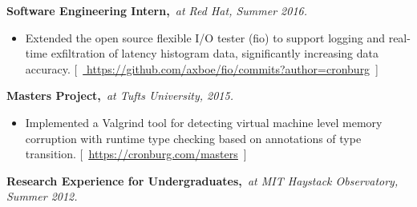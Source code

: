 \begin{minipage}{\linewidth}
{\bf Software Engineering Intern,}{\it~at Red Hat, Summer 2016.}\\[-.4cm]
\begin{itemize}[leftmargin=.5cm]
\item Extended the open source flexible I/O tester (fio) to support logging and
real-time exfiltration of latency histogram data, significantly increasing data
accuracy.
[~\underline{\href{https://github.com/axboe/fio/commits?author=cronburg}{%
https://github.com/axboe/fio/commits?author=cronburg}}~]
\iftoggle{resume}{}{%
\item Developed python scripts for processing latency data from a distributed
file system, CEPH, based on the weighted-percentiles method.
[~\underline{\href{https://www.cronburg.com/fio/MCV\_latencies.pdf}{%
https://www.cronburg.com/fio/MCV\_latencies.pdf}}~]
\item Extensive documentation was recorded on what the data meant and how it
was being analyzed.
[~\underline{\href{https://cronburg.com/fio/cloud-latency-problem-measurement}{https://cronburg.com/fio/cloud-latency-problem-measurement}%
}~]}
\end{itemize}
\end{minipage}

\begin{minipage}{\linewidth}
{\bf Masters Project,}{\it~at Tufts University, 2015.}\\[-.4cm]
\begin{itemize}[leftmargin=.5cm]
\item Implemented a Valgrind tool for detecting virtual machine level memory
  corruption with runtime type checking based on annotations of type transition.
[~\underline{\href{https://cronburg.com/masters}{https://cronburg.com/masters}}~]
\iftoggle{resume}{}{%
\item Evaluated this methodology by reproducing historical bugs in a popular
  research virtual machine, JikesRVM.}
\end{itemize}
\end{minipage}

\iftoggle{resume}{\vspace{-.2cm}}{}
\begin{minipage}{\linewidth}
{\bf Research Experience for Undergraduates,}{\it~at MIT Haystack Observatory, Summer 2012.}%
\iftoggle{resume}{~Radar data analysis.}{\\[-.4cm]
\begin{itemize}[leftmargin=.5cm]
\iftoggle{resume}{}{%
\item Explored the design space of a domain-specific interface definition language for
specifying the types of data generated by atmospheric radar antennas.}
\item Integrated a specification language into a distributed radar pipeline based on the
publish-subscribe messaging pattern.
[~\underline{\href{https://cronburg.com/reu2012.png}{https://cronburg.com/reu2012.png}%
}~]
\end{itemize}%
}
\end{minipage}

